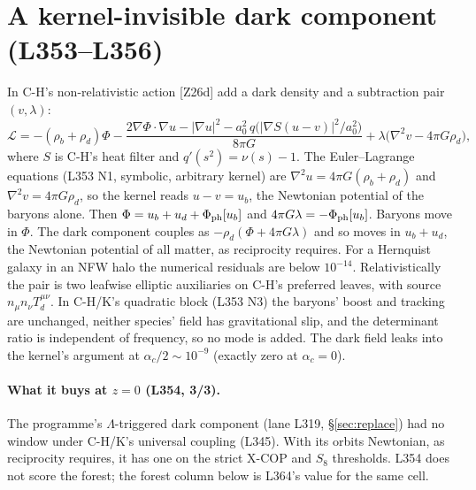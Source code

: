 \documentclass[10pt]{article}
\begin{document}
\section{A kernel-invisible dark component (L353--L356)}\label{sec:pair}

In C-H's non-relativistic action [Z26d] add a dark density and a subtraction pair $(v,\lambda)$:
\begin{equation}
\mathcal L=-(\rho_b+\rho_d)\Phi-\frac{2\nabla\Phi\!\cdot\!\nabla u-|\nabla u|^2-a_0^2\,q\big(|\nabla S(u-v)|^2/a_0^2\big)}{8\pi G}+\lambda\big(\nabla^2v-4\pi G\rho_d\big),
\end{equation}
where $S$ is C-H's heat filter and $q'(s^2)=\nu(s)-1$. The Euler--Lagrange equations (L353 N1, symbolic, arbitrary kernel) are $\nabla^2u=4\pi G(\rho_b+\rho_d)$ and $\nabla^2v=4\pi G\rho_d$, so the kernel reads $u-v=u_b$, the Newtonian potential of the baryons alone. Then $\Phi=u_b+u_d+\Phi_{\rm ph}[u_b]$ and $4\pi G\lambda=-\Phi_{\rm ph}[u_b]$.
Baryons move in $\Phi$. The dark component couples as $-\rho_d(\Phi+4\pi G\lambda)$ and so moves in $u_b+u_d$, the Newtonian potential of all matter, as reciprocity requires. For a Hernquist galaxy in an NFW halo the numerical residuals are below $10^{-14}$.
Relativistically the pair is two leafwise elliptic auxiliaries on C-H's preferred leaves, with source $n_\mu n_\nu T_d^{\mu\nu}$. In C-H/K's quadratic block (L353 N3) the baryons' boost and tracking are unchanged, neither species' field has gravitational slip, and the determinant ratio is independent of frequency, so no mode is added. The dark field leaks into the kernel's argument at $\alpha_c/2\sim10^{-9}$ (exactly zero at $\alpha_c=0$).

\paragraph{What it buys at $z=0$ (L354, 3/3).} The programme's $\Lambda$-triggered dark component (lane L319, \S\ref{sec:replace}) had no window under C-H/K's universal coupling (L345). With its orbits Newtonian, as reciprocity requires, it has one on the strict X-COP and $S_8$ thresholds. L354 does not score the forest; the forest column below is L364's value for the same cell.
\smallskip
\end{document}
